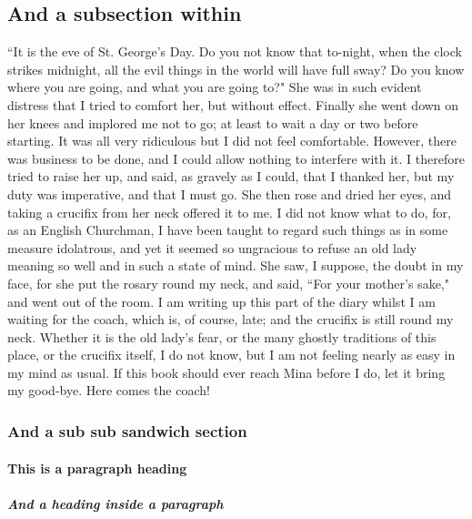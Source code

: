\subsection{And a subsection within}``It is the eve of St. George's Day. Do you not know that to-night, when the clock strikes midnight, all the evil things in the world will have full sway? Do you know where you are going, and what you are going to?" She was in such evident distress that I tried to comfort her, but without effect. Finally she went down on her knees and implored me not to go; at least to wait a day or two before starting. It was all very ridiculous but I did not feel comfortable. However, there was business to be done, and I could allow nothing to interfere with it. I therefore tried to raise her up, and said, as gravely as I could, that I thanked her, but my duty was imperative, and that I must go. She then rose and dried her eyes, and taking a crucifix from her neck offered it to me. I did not know what to do, for, as an English Churchman, I have been taught to regard such things as in some measure idolatrous, and yet it seemed so ungracious to refuse an old lady meaning so well and in such a state of mind. She saw, I suppose, the doubt in my face, for she put the rosary round my neck, and said, ``For your mother's sake," and went out of the room. I am writing up this part of the diary whilst I am waiting for the coach, which is, of course, late; and the crucifix is still round my neck. Whether it is the old lady's fear, or the many ghostly traditions of this place, or the crucifix itself, I do not know, but I am not feeling nearly as easy in my mind as usual. If this book should ever reach Mina before I do, let it bring my good-bye. Here comes the coach!
\subsubsection{And a sub sub sandwich section}
\paragraph{This is a paragraph heading}
\subparagraph{And a heading inside a paragraph}

